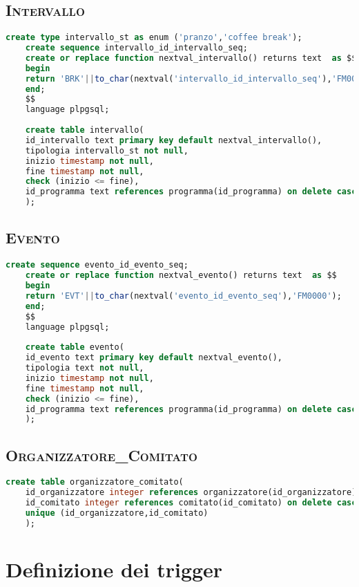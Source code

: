 \subsection{\textsc{Intervallo}}
\begin{lstlisting}[language=SQL,style=mystyle]
	create type intervallo_st as enum ('pranzo','coffee break');
	create sequence intervallo_id_intervallo_seq;
	create or replace function nextval_intervallo() returns text  as $$
	begin
	return 'BRK'||to_char(nextval('intervallo_id_intervallo_seq'),'FM0000');
	end;
	$$
	language plpgsql;
	
	create table intervallo(
	id_intervallo text primary key default nextval_intervallo(),
	tipologia intervallo_st not null,
	inizio timestamp not null,
	fine timestamp not null,
	check (inizio <= fine), 
	id_programma text references programma(id_programma) on delete cascade not null
	);
\end{lstlisting}
\subsection{\textsc{Evento}}
\begin{lstlisting}[language=SQL,style=mystyle]
	create sequence evento_id_evento_seq;
	create or replace function nextval_evento() returns text  as $$
	begin
	return 'EVT'||to_char(nextval('evento_id_evento_seq'),'FM0000');
	end;
	$$
	language plpgsql;
	
	create table evento(
	id_evento text primary key default nextval_evento(),
	tipologia text not null,
	inizio timestamp not null,
	fine timestamp not null,
	check (inizio <= fine), 
	id_programma text references programma(id_programma) on delete cascade not null
	);
\end{lstlisting}
\subsection{\textsc{Organizzatore\_Comitato}}
\begin{lstlisting}[language=SQL,style=mystyle]
	create table organizzatore_comitato(
	id_organizzatore integer references organizzatore(id_organizzatore) on delete cascade,
	id_comitato integer references comitato(id_comitato) on delete cascade,
	unique (id_organizzatore,id_comitato) 
	);
\end{lstlisting}
\section{Definizione dei trigger}
